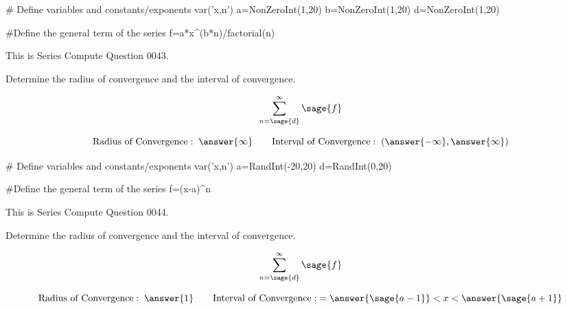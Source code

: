 \documentclass{ximera}
\renewcommand{\latexProblemContent}[1]{#1}
\begin{document}


\begin{sagesilent}
# Define variables and constants/exponents
var('x,n')
a=NonZeroInt(1,20)
b=NonZeroInt(1,20)
d=NonZeroInt(1,20)

#Define the general term of the series
f=a*x^(b*n)/factorial(n)

\end{sagesilent}

\latexProblemContent{
\ifVerboseLocation This is Series Compute Question 0043. \\ \fi
\begin{problem}
Determine the radius of convergence and the interval of convergence. 

\[\sum_{n=\sage{d}}^\infty \sage{f}\]



\[\mbox{Radius of Convergence}:\; \answer{\infty}\qquad \mbox{Interval of Convergence}:\; (\answer{-\infty},\answer{\infty})\]

\end{problem}}%

\begin{sagesilent}
# Define variables and constants/exponents
var('x,n')
a=RandInt(-20,20)
d=RandInt(0,20)

#Define the general term of the series
f=(x-a)^n

\end{sagesilent}

\latexProblemContent{
\ifVerboseLocation This is Series Compute Question 0044. \\ \fi
\begin{problem}
Determine the radius of convergence and the interval of convergence. 

\[\sum_{n=\sage{d}}^\infty \sage{f}\]



\[\mbox{Radius of Convergence}:\; \answer{1}\qquad \mbox{Interval of Convergence}:\; = \answer{\sage{a-1}}<x<\answer{\sage{a+1}}\]

\end{problem}}%
\end{document}
